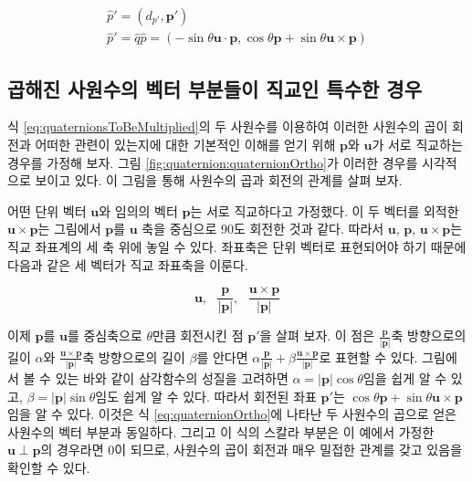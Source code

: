 \begin{eqnarray}
\hat p' = (d_{p'}, \mathbf p') \\ \nonumber
\hat p' = \hat q \hat p =  (-\sin \theta \mathbf u \cdot \mathbf p , \cos \theta \mathbf p + \sin \theta \mathbf u \times \mathbf p)
\label{eq:quaternionOrtho}
\end{eqnarray}

\subsection{곱해진 사원수의 벡터 부분들이 직교인 특수한 경우}

식 \ref{eq:quaternionsToBeMultiplied}의 두 사원수를 이용하여 
이러한 사원수의 곱이 회전과 어떠한 관련이 있는지에 대한 기본적인 이해를 얻기 위해 
$\mathbf p$와 $\mathbf u$가 서로 직교하는 경우를 가정해 보자.
그림 \ref{fig:quaternion:quaternionOrtho}가 이러한 경우를 시각적으로 보이고 있다.
이 그림을 통해 사원수의 곱과 회전의 관계를 살펴 보자.

어떤 단위 벡터 $\mathbf u$와 임의의 벡터 $\mathbf p$는 서로 직교하다고 가정했다. 이 두 벡터를 외적한 $\mathbf u \times \mathbf p$는
그림에서 $\mathbf p$를 $\mathbf u$ 축을 중심으로 90도 회전한 것과 같다. 따라서 $\mathbf u$, $\mathbf p$, $\mathbf u \times \mathbf p$는
직교 좌표계의 세 축 위에 놓일 수 있다. 좌표축은 단위 벡터로 표현되어야 하기 때문에 다음과 같은 세 벡터가 직교 좌표축을 이룬다.

$$\mathbf u, ~~~\frac{\mathbf p}{ |\mathbf p| }, ~~~\frac{\mathbf u \times \mathbf p}{|\mathbf p|}$$

이제 $\mathbf p$를 $\mathbf u$를 중심축으로 $\theta$만큼 회전시킨 점 $\mathbf p'$을 살펴 보자.
이 점은 $\frac{\mathbf p}{ |\mathbf p| }$축 방향으로의 길이 $\alpha$와 $\frac{\mathbf u \times \mathbf p}{|\mathbf p|}$축 방향으로의 
길이 $\beta$를 안다면 $\alpha \frac{\mathbf p}{ |\mathbf p| } + \beta \frac{\mathbf u \times \mathbf p}{|\mathbf p|}$로 표현할 수 있다.
그림에서 볼 수 있는 바와 같이 삼각함수의 성질을 고려하면 $\alpha = |\mathbf p| \cos \theta$임을 쉽게 알 수 있고,
$\beta = |\mathbf p| \sin \theta$임도 쉽게 알 수 있다.
따라서 회전된 좌표 $\mathbf p'$는 $ \cos \theta \mathbf p + \sin \theta \mathbf u \times \mathbf p$임을 알 수 있다.
이것은 식 \ref{eq:quaternionOrtho}에 나타난 두 사원수의 곱으로 얻은 사원수의 벡터 부분과 동일하다. 그리고 이 식의 스칼라 부분은 
이 예에서 가정한 $\mathbf u  \perp \mathbf p$의 경우라면 0이 되므로, 사원수의 곱이 회전과 매우 밀접한 관계를 갖고 있음을 확인할 수 있다.



